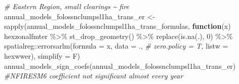 \documentclass[10pt,landscape,a3paper]{article}
\newenvironment{Shaded}{\begin{snugshade}}{\end{snugshade}}
\newcommand{\AttributeTok}[1]{\textcolor[rgb]{0.77,0.63,0.00}{#1}}
\newcommand{\CommentTok}[1]{\textcolor[rgb]{0.56,0.35,0.01}{\textit{#1}}}
\newcommand{\ControlFlowTok}[1]{\textcolor[rgb]{0.13,0.29,0.53}{\textbf{#1}}}
\newcommand{\DecValTok}[1]{\textcolor[rgb]{0.00,0.00,0.81}{#1}}
\newcommand{\FunctionTok}[1]{\textcolor[rgb]{0.00,0.00,0.00}{#1}}
\newcommand{\NormalTok}[1]{#1}
\newcommand{\OtherTok}[1]{\textcolor[rgb]{0.56,0.35,0.01}{#1}}
\newcommand{\SpecialCharTok}[1]{\textcolor[rgb]{0.00,0.00,0.00}{#1}}
\begin{document}
\begin{Shaded}
\begin{Highlighting}[]
\CommentTok{\# Eastern Region, small clearings \textasciitilde{} fire}
\NormalTok{annual\_models\_folossnclumpsl1ha\_trans\_er }\OtherTok{\textless{}{-}} \FunctionTok{sapply}\NormalTok{(annual\_models\_folossnclumpsl1ha\_trans\_formulas,}
                        \ControlFlowTok{function}\NormalTok{(x)}
\NormalTok{                          hexzonalfmter }\SpecialCharTok{\%\textgreater{}\%}
                          \FunctionTok{st\_drop\_geometry}\NormalTok{() }\SpecialCharTok{\%\textgreater{}\%}
                          \FunctionTok{replace}\NormalTok{(}\FunctionTok{is.na}\NormalTok{(.), }\DecValTok{0}\NormalTok{) }\SpecialCharTok{\%\textgreater{}\%}
\NormalTok{                          spatialreg}\SpecialCharTok{::}\FunctionTok{errorsarlm}\NormalTok{(}\AttributeTok{formula =}\NormalTok{ x,}
                                                 \AttributeTok{data =}\NormalTok{ ., }\CommentTok{\# zero.policy = T,}
                                                 \AttributeTok{listw =}\NormalTok{ hexwwer),}
                        \AttributeTok{simplify =}\NormalTok{ F)}
\FunctionTok{annual\_models\_sign\_coefs}\NormalTok{(annual\_models\_folossnclumpsl1ha\_trans\_er) }\CommentTok{\#NFIRESM6 coefficient not significant almost every year}


\end{Highlighting}
\end{Shaded}
\end{document}
